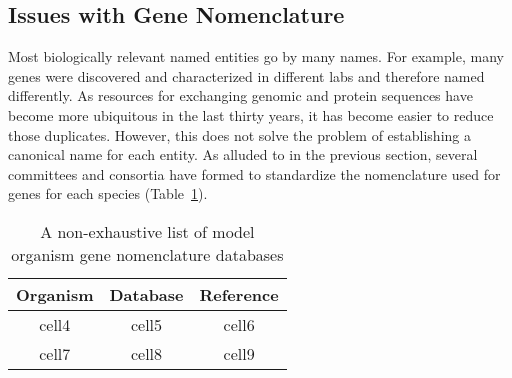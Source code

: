 \subsection{Issues with Gene Nomenclature}

Most biologically relevant named entities go by many names.
For example, many genes were discovered and characterized in different labs and therefore named differently.
As resources for exchanging genomic and protein sequences have become more ubiquitous in the last thirty years, it has become easier to reduce those duplicates.
However, this does not solve the problem of establishing a canonical name for each entity.
As alluded to in the previous section, several committees and consortia have formed to standardize the nomenclature used for genes for each species (Table~\ref{table:gene_nomenclature_databases}).

\begin{table}
    \centering
    \begin{tabular}{ c c c }
        Organism & Database & Reference \\
        \hline
        cell4 & cell5 & cell6 \\
        cell7 & cell8 & cell9
    \end{tabular}
    \caption{A non-exhaustive list of model organism gene nomenclature databases}
    \label{table:gene_nomenclature_databases}
\end{table}
